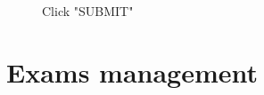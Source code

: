 \documentclass[ManualeUtente]{subfiles}
\begin{document}
\begin{enumerate}
	\begin{figure}[H]
		\centering
		\caption{Click "SUBMIT"}
		\label{fig:Click "SUBMIT"}
	\end{figure}
\end{enumerate}

\section{Exams management}
\end{document}
